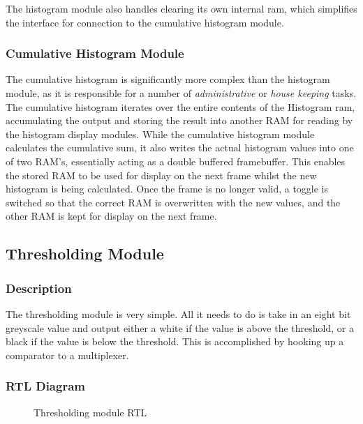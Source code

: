 \documentclass[12pt]{article}
\begin{document}
  The histogram module also handles clearing its own internal ram, which simplifies the interface for connection to the cumulative histogram module.
  
  \subsubsection{Cumulative Histogram Module}
  The cumulative histogram is significantly more complex than the histogram module, as it is responsible for a number of \textit{administrative} or \textit{house keeping} tasks. The cumulative histogram iterates over the entire contents of the Histogram ram, accumulating the output and storing the result into another RAM for reading by the histogram display modules. While the cumulative histogram module calculates the cumulative sum, it also writes the actual histogram values into one of two RAM's, essentially acting as a double buffered framebuffer. This enables the stored RAM to be used for display on the next frame whilst the new histogram is being calculated. Once the frame is no longer valid, a toggle is switched so that the correct RAM is overwritten with the new values, and the other RAM is kept for display on the next frame.

  \subsection{Thresholding Module}
  \subsubsection{Description}
  The thresholding module is very simple. All it needs to do is take in an eight bit greyscale value and output either a white if the value is above the threshold, or a black if the value is below the threshold. This is accomplished by hooking up a comparator to a multiplexer.
  
  \subsubsection{RTL Diagram}
  \begin{figure}[H]
    \caption{Thresholding module RTL}
    \label{fig:thresholder_rtl}
  \end{figure}
  
\end{document}
